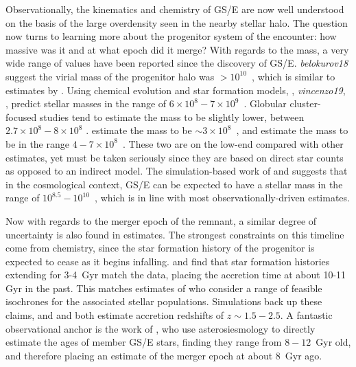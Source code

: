 Observationally, the kinematics and chemistry of GS/E are now well understood on the basis of the large overdensity seen in the nearby stellar halo. The question now turns to learning more about the progenitor system of the encounter: how massive was it and at what epoch did it merge? With regards to the mass, a very wide range of values have been reported since the discovery of GS/E. \textit{belokurov18} suggest the virial mass of the progenitor halo was $> 10^{10}$~\Msun, which is similar to estimates by \textcite{das20}. Using chemical evolution and star formation models, \textcite{helmi18}, \textit{vincenzo19}, \textcite{feuillet20}, predict stellar masses in the range of $6\times10^{8} - 7\times10^{9}$~\Msun. Globular cluster-focused studies tend to estimate the mass to be slightly lower, between $2.7\times10^{8}-8\times10^{8}$ \parencite{kruijssen20,forbes20}. \textcite{mackereth20} estimate the mass to be $\sim 3\times10^{8}$~\Msun, and \textcite{naidu20} estimate the mass to be in the range $4-7\times10^{8}$~\Msun. These two are on the low-end compared with other estimates, yet must be taken seriously since they are based on direct star counts as opposed to an indirect model. The simulation-based work of \textcite{fattahi19} and \textcite{mackereth19a} suggests that in the cosmological context, GS/E can be expected to have a stellar mass in the range of $10^{8.5}-10^{10}$~\Msun, which is in line with most observationally-driven estimates. 

Now with regards to the merger epoch of the remnant, a similar degree of uncertainty is also found in estimates. The strongest constraints on this timeline come from chemistry, since the star formation history of the progenitor is expected to cease as it begins infalling. \textcite{vincenzo19} and \textcite{sanders21} find that star formation histories extending for 3-4~Gyr match the data, placing the accretion time at about 10-11 Gyr in the past. This matches estimates of \textcite{helmi18} who consider a range of feasible isochrones for the associated stellar populations. Simulations back up these claims, and \textcite{fattahi19} and \textcite{mackereth19a} both estimate accretion redshifts of $z \sim 1.5-2.5$. A fantastic observational anchor is the work of \textcite{montalban21}, who use asterosiesmology to directly estimate the ages of member GS/E stars, finding they range from $8-12$~Gyr old, and therefore placing an estimate of the merger epoch at about 8~Gyr ago.

